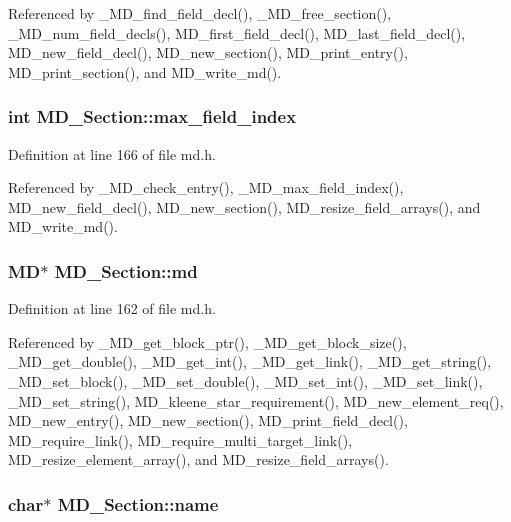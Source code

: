 Referenced by \_\-MD\_\-find\_\-field\_\-decl(), \_\-MD\_\-free\_\-section(), \_\-MD\_\-num\_\-field\_\-decls(), MD\_\-first\_\-field\_\-decl(), MD\_\-last\_\-field\_\-decl(), MD\_\-new\_\-field\_\-decl(), MD\_\-new\_\-section(), MD\_\-print\_\-entry(), MD\_\-print\_\-section(), and MD\_\-write\_\-md().
\subsubsection{\setlength{\rightskip}{0pt plus 5cm}int \bf{MD\_\-Section::max\_\-field\_\-index}}\label{structMD__Section_da9890b63c826f26fa6bedfd6d01c22c}




Definition at line 166 of file md.h.

Referenced by \_\-MD\_\-check\_\-entry(), \_\-MD\_\-max\_\-field\_\-index(), MD\_\-new\_\-field\_\-decl(), MD\_\-new\_\-section(), MD\_\-resize\_\-field\_\-arrays(), and MD\_\-write\_\-md().
\subsubsection{\setlength{\rightskip}{0pt plus 5cm}\bf{MD}$\ast$ \bf{MD\_\-Section::md}}\label{structMD__Section_591a84eb045f1fb8b356fe0844e5730c}




Definition at line 162 of file md.h.

Referenced by \_\-MD\_\-get\_\-block\_\-ptr(), \_\-MD\_\-get\_\-block\_\-size(), \_\-MD\_\-get\_\-double(), \_\-MD\_\-get\_\-int(), \_\-MD\_\-get\_\-link(), \_\-MD\_\-get\_\-string(), \_\-MD\_\-set\_\-block(), \_\-MD\_\-set\_\-double(), \_\-MD\_\-set\_\-int(), \_\-MD\_\-set\_\-link(), \_\-MD\_\-set\_\-string(), MD\_\-kleene\_\-star\_\-requirement(), MD\_\-new\_\-element\_\-req(), MD\_\-new\_\-entry(), MD\_\-new\_\-section(), MD\_\-print\_\-field\_\-decl(), MD\_\-require\_\-link(), MD\_\-require\_\-multi\_\-target\_\-link(), MD\_\-resize\_\-element\_\-array(), and MD\_\-resize\_\-field\_\-arrays().
\subsubsection{\setlength{\rightskip}{0pt plus 5cm}char$\ast$ \bf{MD\_\-Section::name}}\label{structMD__Section_46dce333d5cc9f32edb7e71f9b382ca3}




